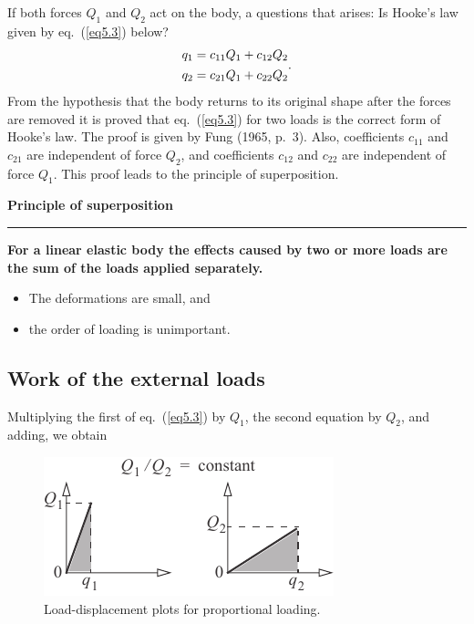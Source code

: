 \documentclass{AeroStructure-ERJohnson}
\begin{document}
If both forces $Q_1$ and $Q_2$ act on the body, a questions that arises: Is Hooke's law given by eq.~(\ref{eq5.3}) below?\vspace*{-4pt}
\begin{gather}\label{eq5.3}
\begin{array}{@{}l@{}}
q_{1}=c_{11} Q_{1}+c_{12} Q_{2} \\[4pt]
q_{2}=c_{21} Q_{1}+c_{22} Q_{2}
\end{array}.
\end{gather}
From the hypothesis that the body returns to its original shape after the forces are removed it is proved that eq.~(\ref{eq5.3}) for two loads is the correct form of Hooke's law. The proof is given by Fung (1965, p.~3). Also, coefficients $c_{11}$ and $c_{21}$ are independent of force $Q_2$, and coefficients $c_{12}$ and $c_{22}$ are independent of force $Q_1$. This proof leads to the principle of superposition.

\begin{framed}
\noindent\textbf{Principle of superposition}\\
\hspace*{-10pt}\rule{37.45pc}{2pt}
\textbf{For a linear elastic body the effects caused by two or more loads are the sum of the loads applied separately.}\vspace*{-6pt}
\begin{itemize}
\item The deformations are small, and
\item the order of loading is unimportant.\vspace*{-5pt}
\end{itemize}
\end{framed}

\subsection{Work of the external loads}\label{sec5.1.1}


Multiplying the first of eq.~(\ref{eq5.3}) by $Q_{1}$, the second equation by $Q_{2}$, and adding, we obtain

\begin{figure}
\vspace*{15pt}
\includegraphics{Figure_5-2.pdf}
\caption{Load-displacement plots for proportional loading. \label{fig5.2}}
\vspace*{-25pt}
\end{figure}
\end{document}
